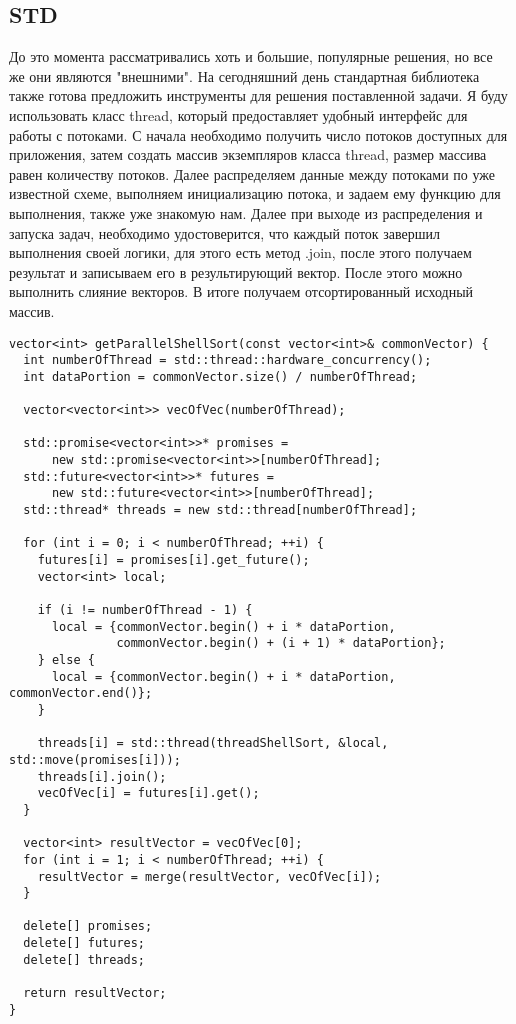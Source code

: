 \documentclass{report}
\begin{document}
\subsection*{STD}
\par До это момента рассматривались хоть и большие, популярные решения, но все же они являются "внешними". На сегодняшний день стандартная библиотека также готова предложить инструменты для решения поставленной задачи. Я буду использовать класс thread, который предоставляет удобный интерфейс для работы с потоками. С начала необходимо получить число потоков доступных для приложения, затем создать массив экземпляров класса thread, размер массива равен количеству потоков. Далее распределяем данные между потоками по уже известной схеме, выполняем инициализацию потока, и задаем ему функцию для выполнения, также уже знакомую нам. Далее при выходе из распределения и запуска задач, необходимо удостоверится, что каждый поток завершил выполнения своей логики, для этого есть метод .join, после этого получаем результат и записываем его в результирующий вектор. После этого можно выполнить слияние векторов. В итоге получаем отсортированный исходный массив.

\begin{lstlisting}
vector<int> getParallelShellSort(const vector<int>& commonVector) {
  int numberOfThread = std::thread::hardware_concurrency();
  int dataPortion = commonVector.size() / numberOfThread;

  vector<vector<int>> vecOfVec(numberOfThread);

  std::promise<vector<int>>* promises =
      new std::promise<vector<int>>[numberOfThread];
  std::future<vector<int>>* futures =
      new std::future<vector<int>>[numberOfThread];
  std::thread* threads = new std::thread[numberOfThread];

  for (int i = 0; i < numberOfThread; ++i) {
    futures[i] = promises[i].get_future();
    vector<int> local;

    if (i != numberOfThread - 1) {
      local = {commonVector.begin() + i * dataPortion,
               commonVector.begin() + (i + 1) * dataPortion};
    } else {
      local = {commonVector.begin() + i * dataPortion, commonVector.end()};
    }

    threads[i] = std::thread(threadShellSort, &local, std::move(promises[i]));
    threads[i].join();
    vecOfVec[i] = futures[i].get();
  }

  vector<int> resultVector = vecOfVec[0];
  for (int i = 1; i < numberOfThread; ++i) {
    resultVector = merge(resultVector, vecOfVec[i]);
  }

  delete[] promises;
  delete[] futures;
  delete[] threads;

  return resultVector;
}
\end{lstlisting}
\end{document}
